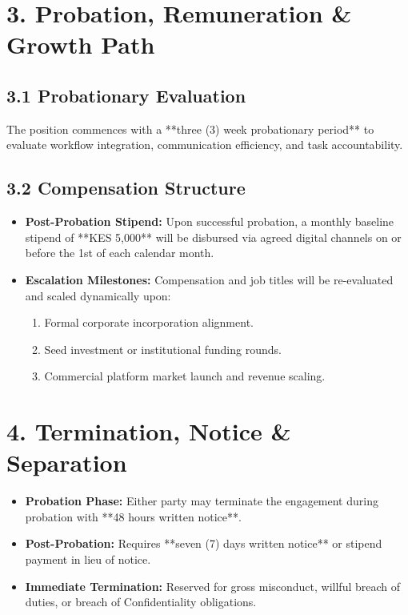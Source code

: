 \documentclass[11pt,a4paper]{article}
\begin{document}

\section{3. Probation, Remuneration \& Growth Path}

\subsection{3.1 Probationary Evaluation}
The position commences with a **three (3) week probationary period** to evaluate workflow integration, communication efficiency, and task accountability.

\subsection{3.2 Compensation Structure}
\begin{itemize}
    \item \textbf{Post-Probation Stipend:} Upon successful probation, a monthly baseline stipend of **KES 5,000** will be disbursed via agreed digital channels on or before the 1st of each calendar month.
    \item \textbf{Escalation Milestones:} Compensation and job titles will be re-evaluated and scaled dynamically upon:
    \begin{enumerate}
        \item Formal corporate incorporation alignment.
        \item Seed investment or institutional funding rounds.
        \item Commercial platform market launch and revenue scaling.
    \end{enumerate}
\end{itemize}

\section{4. Termination, Notice \& Separation}

\begin{itemize}
    \item \textbf{Probation Phase:} Either party may terminate the engagement during probation with **48 hours written notice**.
    \item \textbf{Post-Probation:} Requires **seven (7) days written notice** or stipend payment in lieu of notice.
    \item \textbf{Immediate Termination:} Reserved for gross misconduct, willful breach of duties, or breach of Confidentiality obligations.
\end{itemize}
\end{document}
